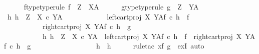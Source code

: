 \begin{isabellebody}
\ \ \ \ \isamarkupfalse%
\ f{\isacharunderscore}{\kern0pt}type{\isacharbrackleft}{\kern0pt}type{\isacharunderscore}{\kern0pt}rule{\isacharbrackright}{\kern0pt}{\isacharcolon}{\kern0pt}\ {\isachardoublequoteopen}f\ {\isacharcolon}{\kern0pt}\ Z\ {\isasymrightarrow}\ X\isactrlbsup A\isactrlesup {\isachardoublequoteclose}\isanewline
\ \ \ \ \isamarkupfalse%
\ g{\isacharunderscore}{\kern0pt}type{\isacharbrackleft}{\kern0pt}type{\isacharunderscore}{\kern0pt}rule{\isacharbrackright}{\kern0pt}{\isacharcolon}{\kern0pt}\ {\isachardoublequoteopen}g\ {\isacharcolon}{\kern0pt}\ Z\ {\isasymrightarrow}\ Y\isactrlbsup A\isactrlesup {\isachardoublequoteclose}\isanewline
\isanewline
\ \ \ \ \isamarkupfalse%
\ {\isachardoublequoteopen}{\isasymexists}h{\isachardot}{\kern0pt}\ h\ {\isacharcolon}{\kern0pt}\ Z\ {\isasymrightarrow}\ {\isacharparenleft}{\kern0pt}X\ {\isasymtimes}\isactrlsub c\ Y{\isacharparenright}{\kern0pt}\isactrlbsup A\isactrlesup \ {\isasymand}\isanewline
\ \ \ \ \ \ \ \ \ \ \ left{\isacharunderscore}{\kern0pt}cart{\isacharunderscore}{\kern0pt}proj\ X\ Y\isactrlbsup A\isactrlesup \isactrlsub f\ {\isasymcirc}\isactrlsub c\ h\ {\isacharequal}{\kern0pt}\ f\ {\isasymand}\isanewline
\ \ \ \ \ \ \ \ \ \ \ right{\isacharunderscore}{\kern0pt}cart{\isacharunderscore}{\kern0pt}proj\ X\ Y\isactrlbsup A\isactrlesup \isactrlsub f\ {\isasymcirc}\isactrlsub c\ h\ {\isacharequal}{\kern0pt}\ g\ {\isasymand}\isanewline
\ \ \ \ \ \ \ \ \ \ \ {\isacharparenleft}{\kern0pt}{\isasymforall}h{}{\isachardot}{\kern0pt}\ h{}\ {\isacharcolon}{\kern0pt}\ Z\ {\isasymrightarrow}\ {\isacharparenleft}{\kern0pt}X\ {\isasymtimes}\isactrlsub c\ Y{\isacharparenright}{\kern0pt}\isactrlbsup A\isactrlesup \ {\isasymand}\ left{\isacharunderscore}{\kern0pt}cart{\isacharunderscore}{\kern0pt}proj\ X\ Y\isactrlbsup A\isactrlesup \isactrlsub f\ {\isasymcirc}\isactrlsub c\ h{}\ {\isacharequal}{\kern0pt}\ f\ {\isasymand}\ right{\isacharunderscore}{\kern0pt}cart{\isacharunderscore}{\kern0pt}proj\ X\ Y\isactrlbsup A\isactrlesup \isactrlsub f\ {\isasymcirc}\isactrlsub c\ h{}\ {\isacharequal}{\kern0pt}\ g\ {\isasymlongrightarrow}\isanewline
\ \ \ \ \ \ \ \ \ \ \ \ \ \ \ \ \ h{}\ {\isacharequal}{\kern0pt}\ h{\isacharparenright}{\kern0pt}{\isachardoublequoteclose}\isanewline
\ \ \ \ \isamarkupfalse%
\ {\isacharparenleft}{\kern0pt}rule{\isacharunderscore}{\kern0pt}tac\ x{\isacharequal}{\kern0pt}{\isachardoublequoteopen}{\isasymlangle}f\isactrlsup {\isasymflat}\ {\isacharcomma}{\kern0pt}g\isactrlsup {\isasymflat}{\isasymrangle}\isactrlsup {\isasymsharp}{\isachardoublequoteclose}\ \ exI{\isacharcomma}{\kern0pt}\ auto{\isacharparenright}{\kern0pt}\isanewline

\end{isabellebody}
